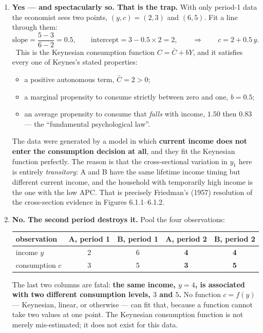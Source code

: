 \documentclass[12pt, letterpaper]{article}
\begin{document}
\begin{tcolorbox}[evenbox,title={Problem 6.4 \quad Consumption and Income}]
\begin{enumerate}
\item \textbf{Yes --- and spectacularly so. That is the trap.} With only period-1 data the
economist sees two points, $(y,c)=(2,3)$ and $(6,5)$. Fit a line through them:
\[
\text{slope}=\frac{5-3}{6-2}=0.5,
\qquad
\text{intercept}=3-0.5\times2=2,
\qquad\Longrightarrow\qquad
\boxed{c=2+0.5\,y} .
\]
\checkmark\ This is the Keynesian consumption function $C=\bar C+bY$, and it satisfies every
one of Keynes's stated properties:
\begin{itemize}[leftmargin=1.3em,itemsep=2pt,topsep=3pt]
\item a positive autonomous term, $\bar C=2>0$;
\item a marginal propensity to consume strictly between zero and one, $b=0.5$;
\item an average propensity to consume that \emph{falls} with income, $1.50$ then $0.83$ ---
      the ``fundamental psychological law''.
\end{itemize}
The data were generated by a model in which \textbf{current income does not enter the
consumption decision at all}, and they fit the Keynesian function perfectly. The reason is
that the cross-sectional variation in $y_1$ here is entirely \emph{transitory}: A and B have
the same lifetime income timing but different current income, and the household with
temporarily high income is the one with the low APC. That is precisely Friedman's (1957)
resolution of the cross-section evidence in Figures 6.1.1--6.1.2.

\item \textbf{No. The second period destroys it.} Pool the four observations:
\begin{center}
\begin{tabular}{@{}lcccc@{}}
\toprule
observation & A, period 1 & B, period 1 & A, period 2 & B, period 2 \\
\midrule
income $y$      & 2 & 6 & \textbf{4} & \textbf{4} \\
consumption $c$ & 3 & 5 & \textbf{3} & \textbf{5} \\
\bottomrule
\end{tabular}
\end{center}
The last two columns are fatal: \textbf{the same income, $y=4$, is associated with two
different consumption levels, $3$ and $5$.} No function $c=f(y)$ --- Keynesian, linear, or
otherwise --- can fit that, because a function cannot take two values at one point. The
Keynesian consumption function is not merely mis-estimated; it does not exist for this data.
\checkmark


\end{enumerate}
\end{tcolorbox}
\end{document}
